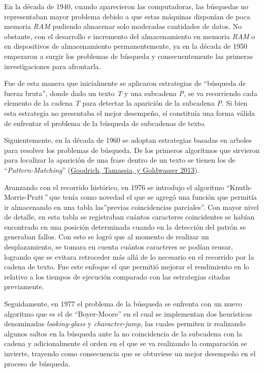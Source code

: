 \documentclass[
  12pt,
  openany]{book}
\begin{document}
En la década de 1940, cuando aparecieron las computadoras, las búsquedas no representaban mayor problema debido a que estas máquinas disponían de poca memoria \emph{RAM} pudiendo almacenar solo moderadas cantidades de datos. No obstante, con el desarrollo e incremento del almacenamiento en memoria \emph{RAM} o en dispositivos de almacenamiento permanentemente, ya en la década de 1950 empezaron a surgir los problemas de búsqueda y consecuentemente las primeras investigaciones para afrontarla.

Fue de esta manera que inicialmente se aplicaron estrategias de ``búsqueda de fuerza bruta'', donde dado un texto \emph{T} y una subcadena \emph{P,} se va recorriendo cada elemento de la cadena \emph{T} para detectar la aparición de la subcadena \emph{P}. Si bien esta estrategia no presentaba el mejor desempeño, sí constituía una forma válida de enfrentar el problema de la búsqueda de subcadenas de texto.

Siguientemente, en la década de 1960 se adoptan estrategias basadas en arboles para resolver los problemas de búsqueda. De los primeros algoritmos que sirvieron para localizar la aparición de una frase dentro de un texto se tienen los de ``\emph{Pattern-Matching}'' (\protect\hyperlink{ref-goodrich2013}{Goodrich, Tamassia, y Goldwasser 2013}).

Avanzando con el recorrido histórico, en 1976 se introdujo el algoritmo ``Knuth-Morris-Pratt\emph{''} que tenía como novedad el que se agregó una función que permitía ir almacenando en una tabla las''previas coincidencias parciales''. Con mayor nivel de detalle, en esta tabla se registraban cuántos caracteres coincidentes se habían encontrado en una posición determinada cuando en la detección del patrón se generaban fallos. Con esto se logró que al momento de realizar un desplazamiento, se tomara en cuenta cuántos caracteres se podían reusar, logrando que se evitara retroceder más allá de lo necesario en el recorrido por la cadena de texto. Fue este enfoque el que permitió mejorar el rendimiento en lo relativo a los tiempos de ejecución comparado con las estrategias citadas previamente.

Seguidamente, en 1977 el problema de la búsqueda se enfrenta con un nuevo algoritmo que es el de ``Boyer-Moore'' en el cual se implementan dos heurísticas denominadas \emph{looking-glass} y \emph{character-jump,} las cuales permiten ir realizando algunos saltos en la búsqueda ante la no coincidencia de la subcadena con la cadena y adicionalmente el orden en el que se va realizando la comparación se invierte, trayendo como consecuencia que se obtuviese un mejor desempeño en el proceso de búsqueda.
\end{document}
